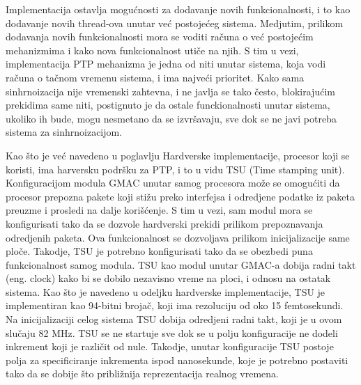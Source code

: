 \documentclass[a4paper,12pt, master]{etf}
\begin{document}
	Implementacija ostavlja mogu\'{c}nosti za dodavanje novih funkcionalnosti,
	i to kao dodavanje novih thread-ova unutar ve\'{c} postoje\'{c}eg sistema.
	Medjutim, prilikom dodavanja novih funkcionalnosti mora se voditi
	ra\v{c}una o ve\'{c} postoje\'{c}im mehanizmima i kako nova funkcionalnost
	uti\v{c}e na njih. S tim u vezi, implementacija PTP mehanizma je jedna od
	niti unutar sistema, koja vodi ra\v{c}una o ta\v{c}nom vremenu sistema, i
	ima najve\'{c}i prioritet. Kako sama sinhrnoizacija nije vremenski zahtevna,
	 i ne javlja se tako \v{c}esto, blokiraju\'{c}im prekidima same niti,
	postignuto je da ostale funckionalnosti unutar sistema, ukoliko ih bude,
	mogu nesmetano da se izvr\v{s}avaju, sve dok se ne javi potreba sistema za
	sinhrnoizacijom.

	Kao \v{s}to je ve\'{c} navedeno u poglavlju Hardverske implementacije,
	procesor koji se koristi, ima harversku podr\v{s}ku za PTP, i to u vidu TSU
	(Time stamping unit). Konfiguracijom modula GMAC unutar samog procesora
	mo\v{z}e se omogu\'{c}iti da procesor prepozna pakete koji sti\v{z}u preko
	interfejsa i odredjene podatke iz paketa preuzme i prosledi na dalje
	kori\v{s}\'{c}enje. S tim u vezi, sam modul mora se konfigurisati tako da
	se dozvole hardverski prekidi prilikom prepoznavanja odredjenih paketa. Ova
	funkcionalnost se dozvoljava prilikom inicijalizacije same plo\v{c}e.
	Takodje, TSU je potrebno konfigurisati tako da se obezbedi puna
    funkcionalnost samog modula. TSU kao modul unutar GMAC-a dobija radni takt
	(eng\@. clock) kako bi se dobilo nezavisno vreme na ploci, i odnosu na
    ostatak sistema. Kao \v{s}to je navedeno u odeljku hardverske
    implementacije, TSU je implementiran kao 94-bitni broja\v{c}, koji ima
	rezoluciju od oko 15 femtosekundi. Na inicijalizaciji celog sistema TSU
	dobija odredjeni radni takt, koji je u ovom slu\v{c}aju 82 MHz. TSU se ne
    startuje sve dok se u polju konfiguracije ne dodeli inkrement koji je
    razli\v{c}it od nule. Takodje, unutar konfiguracije TSU postoje polja za
    specificiranje inkrementa ispod nanosekunde, koje je potrebno postaviti tako
    da se dobije \v{s}to pribli\v{z}nija reprezentacija realnog vremena.
\end{document}
